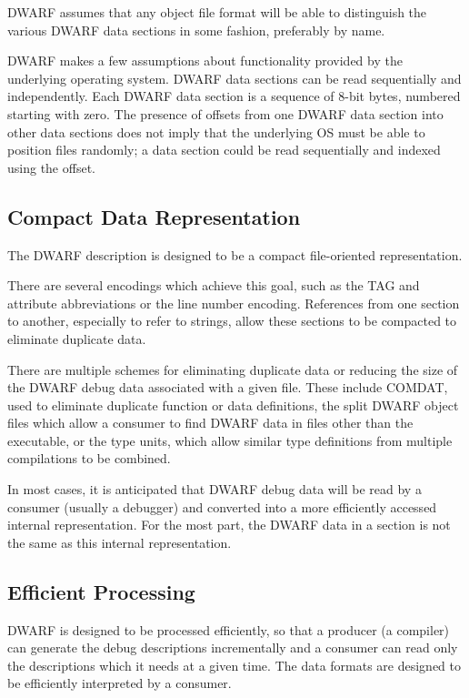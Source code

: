 DWARF assumes that any object file format will be able to
distinguish the various DWARF data sections in some fashion,
preferably by name.

DWARF makes a few assumptions about functionality provided by
the underlying operating system.  DWARF data sections can be
read sequentially and independently.
Each DWARF data section is a sequence of 8-bit bytes,
numbered starting with zero.  The presence of offsets from one
DWARF data section into other data sections does not imply that
the underlying OS must be able to position files randomly; a
data section could be read sequentially and indexed using the offset.

\subsection{Compact Data Representation}
The DWARF description is designed to be a compact file-oriented
representation.

There are several encodings which achieve this goal, such as the
TAG and attribute abbreviations or the line number encoding.
References from one section to another, especially to refer to
strings, allow these sections to be compacted to eliminate
duplicate data.

There are multiple schemes for eliminating duplicate data or
reducing the size of the DWARF debug data associated with a
given file.  These include COMDAT, used to eliminate duplicate
function or data definitions, the split DWARF object files
which allow a consumer to find DWARF data in files other than
the executable, or the type units, which allow similar type
definitions from multiple compilations to be combined.

In most cases, it is anticipated that DWARF
debug data will be read by a consumer (usually a debugger) and
converted into a more efficiently accessed internal representation.
For the most part, the DWARF data in a section is not the same as
this internal representation.

\subsection{Efficient Processing}
DWARF is designed to be processed efficiently, so that a
producer (a compiler) can generate the debug descriptions
incrementally and a consumer can read only the descriptions
which it needs at a given time. The data formats are designed
to be efficiently interpreted by a consumer.

